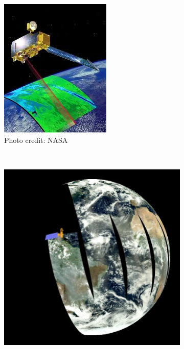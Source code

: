 \documentclass{article}\usepackage[]{graphicx}\usepackage[]{color}
\begin{document}
\begin{figure}[!ht]
    \centering
    \begin{subfigure}[ht]{0.3\textwidth}
        \includegraphics[width=\textwidth]{MODISpic2.jpeg}
        \caption{Photo credit: NASA}
    \end{subfigure}
    ~ %
    \begin{subfigure}[ht]{0.37\textwidth}
        \includegraphics[width=\textwidth]{MODISpic1.jpg}

\end{subfigure}
\end{figure}
\end{document}
